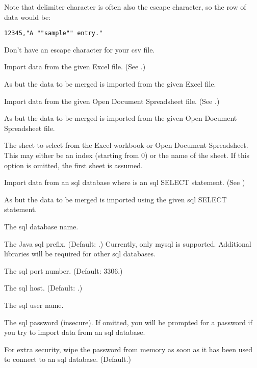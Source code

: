 Note that delimiter character is often also the escape character, so
the row of data would be:
\begin{verbatim}
12345,"A ""sample"" entry."
\end{verbatim} 

Don't have an escape character for your \gls{csv} file.

Import data from the given Excel  file. 
(See .)

As  but the data to be merged is imported from the
given Excel  file.

Import data from the given Open Document Spreadsheet  file. 
(See .)

As  but the data to be merged is imported from the
given Open Document Spreadsheet  file.

The sheet to select from the Excel workbook or Open Document 
Spreadsheet. This may either be an index (starting from 0) or 
the name of the sheet. If this option is omitted, the first sheet is assumed.

Import data from an \gls{sql} database where 
 is an \gls{sql} SELECT statement.
(See )

As  but the data to be merged is imported using the
given \gls{sql} SELECT statement.

The \gls{sql} database name.

The Java \gls{sql} prefix. (Default: .)
Currently, only \gls{mysql} is supported. Additional libraries will
be required for other \gls{sql} databases.

The \gls{sql} port number. (Default: 3306.)

The \gls{sql} host. (Default: .)

The \gls{sql} user name.

The \gls{sql} password (insecure). If omitted, you will be prompted 
for a password if you try to import data from an \gls{sql} 
database.

For extra security, wipe the password from memory as soon as it 
has been used to connect to an \gls{sql} database. (Default.)

